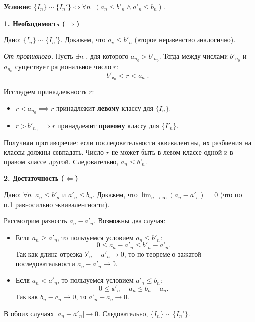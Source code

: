 \begin{tcolorbox}[title=Доказательство Теоремы 1 (Пункт 2), breakable]
    \textbf{Условие:} $\{ I_n \} \sim \{ I_n' \} \iff \forall n \;\; (a_n \le b'_n \land a'_n \le b_n)$.
    
    \medskip
    \textbf{1. Необходимость ($\Rightarrow$)}
    
    Дано: $\{ I_n \} \sim \{ I_n' \}$. Докажем, что $a_n \le b'_n$ (второе неравенство аналогично).
    
    \textit{От противного.} Пусть $\exists n_0$, для которого $a_{n_0} > b'_{n_0}$.
    Тогда между числами $b'_{n_0}$ и $a_{n_0}$ существует рациональное число $r$:
    \[ b'_{n_0} < r < a_{n_0}. \]
    
    Исследуем принадлежность $r$:
    \begin{itemize}
        \item $r < a_{n_0} \implies r$ принадлежит \textbf{левому} классу для $\{I_n\}$.
        \item $r > b'_{n_0} \implies r$ принадлежит \textbf{правому} классу для $\{I'_n\}$.
    \end{itemize}
    
    Получили противоречие: если последовательности эквивалентны, их разбиения на классы должны совпадать. Число $r$ не может быть в левом классе одной и в правом классе другой.
    Следовательно, $a_n \le b'_n$.

    \medskip
    \textbf{2. Достаточность ($\Leftarrow$)}
    
    Дано: $\forall n \;\; a_n \le b'_n$ и $a'_n \le b_n$.
    Докажем, что $\lim_{n \to \infty} (a_n - a'_n) = 0$ (что по п.1 равносильно эквивалентности).
    
    Рассмотрим разность $a_n - a'_n$. Возможны два случая:
    
    \begin{itemize}
        \item Если $a_n \ge a'_n$, то пользуемся условием $a_n \le b'_n$:
        \[ 0 \le a_n - a'_n \le b'_n - a'_n. \]
        Так как длина отрезка $b'_n - a'_n \to 0$, то по теореме о зажатой последовательности $a_n - a'_n \to 0$.
        
        \item Если $a_n < a'_n$, то пользуемся условием $a'_n \le b_n$:
        \[ 0 \le a'_n - a_n \le b_n - a_n. \]
        Так как $b_n - a_n \to 0$, то $a'_n - a_n \to 0$.
    \end{itemize}
    
    В обоих случаях $|a_n - a'_n| \to 0$.
    Следовательно, $\{ I_n \} \sim \{ I_n' \}$.
\end{tcolorbox}

